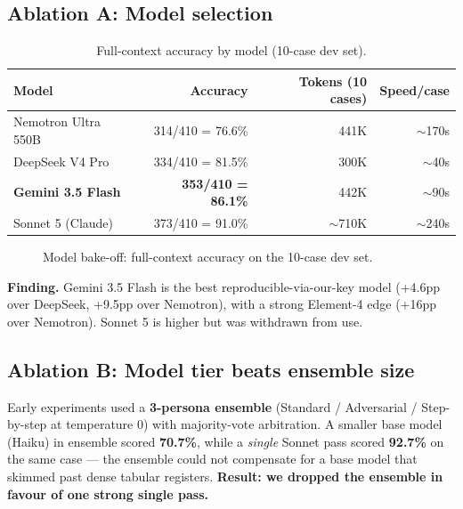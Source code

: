 \documentclass[11pt,a4paper]{article}
\begin{document}
\subsection{Ablation A: Model selection}
\begin{table}[htbp]\centering\small
\caption{Full-context accuracy by model (10-case dev set).}
\begin{tabular}{@{}lrrr@{}}
\toprule
\textbf{Model} & \textbf{Accuracy} & \textbf{Tokens (10 cases)} & \textbf{Speed/case} \\
\midrule
Nemotron Ultra 550B & 314/410 = 76.6\% & 441K & $\sim$170s \\
DeepSeek V4 Pro & 334/410 = 81.5\% & 300K & $\sim$40s \\
\textbf{Gemini 3.5 Flash} & \textbf{353/410 = 86.1\%} & 442K & $\sim$90s \\
Sonnet 5 (Claude) & 373/410 = 91.0\% & $\sim$710K & $\sim$240s \\
\bottomrule
\end{tabular}
\end{table}

\begin{figure}[htbp]\centering
{}
\caption{Model bake-off: full-context accuracy on the 10-case dev set.}
\end{figure}

\textbf{Finding.} Gemini 3.5 Flash is the best reproducible-via-our-key model (+4.6pp over DeepSeek, +9.5pp over Nemotron), with a strong Element-4 edge (+16pp over Nemotron). Sonnet 5 is higher but was withdrawn from use.

\subsection{Ablation B: Model tier beats ensemble size}
Early experiments used a \textbf{3-persona ensemble} (Standard / Adversarial / Step-by-step at temperature 0) with majority-vote arbitration. A smaller base model (Haiku) in ensemble scored \textbf{70.7\%}, while a \emph{single} Sonnet pass scored \textbf{92.7\%} on the same case --- the ensemble could not compensate for a base model that skimmed past dense tabular registers. \textbf{Result: we dropped the ensemble in favour of one strong single pass.}
\end{document}
